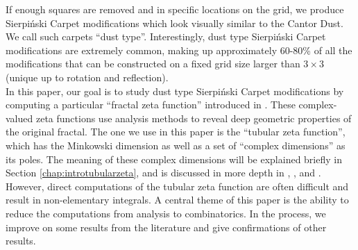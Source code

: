 \documentclass{article}
\theoremstyle{plain}
\numberwithin{equation}{section}
\numberwithin{table}{section}
\numberwithin{figure}{section}
\begin{document}
If enough squares are removed and in specific locations on the grid, we produce Sierpi\'nski Carpet modifications which look visually similar to the Cantor Dust. We call such carpets ``dust type''. Interestingly, dust type Sierpi\'nski Carpet modifications are extremely common, making up approximately 60-80\% of all the modifications that can be constructed on a fixed grid size larger than $3\times3$ (unique up to rotation and reflection). \\

In this paper, our goal is to study dust type Sierpi\'nski Carpet modifications by computing a particular ``fractal zeta function'' introduced in \cite{lapidusbook}. These complex-valued zeta functions use analysis methods to reveal deep geometric properties of the original fractal. The one we use in this paper is the ``tubular zeta function'', which has the Minkowski dimension as well as a set of ``complex dimensions'' as its poles. The meaning of these complex dimensions will be explained briefly in Section \ref{chap:introtubularzeta}, and is discussed in more depth in \cite{lapidusbook}, \cite{lapidusbook2}, and \cite{lapidusbook3}. However, direct computations of the tubular zeta function are often difficult and result in non-elementary integrals. A central theme of this paper is the ability to reduce the computations from analysis to combinatorics. In the process, we improve on some results from the literature and give confirmations of other results. \\
\end{document}
